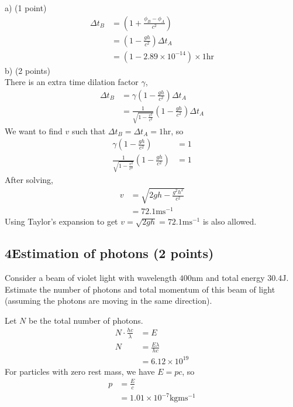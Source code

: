 \documentclass[12pt]{book} %
\numberwithin{equation}{chapter}
\def\c{\gamma}
\def\D{\Delta}
\def\l{\lambda}
\def\lq{\hspace{2.5ex}}
\begin{document}
\begin{solbox}
a) (1 point)
\begin{align*}
\D t_{B}&=\left(1+\frac{\phi_{B}-\phi_{A}}{c^{2}}\right)\\
&=\left(1-\frac{gh}{c^{2}}\right)\D t_{A}\\
&=\left(1-2.89\times10^{-14}\right)\times 1\text{hr}
\end{align*}
b) (2 points)\\
There is an extra time dilation factor $\c$,
\begin{align*}
\D t_{B}&=\c\left(1-\frac{gh}{c^{2}}\right)\D t_{A}\\
&=\frac{1}{\sqrt{1-\frac{v^{2}}{c^{2}}}}\left(1-\frac{gh}{c^{2}}\right)\D t_{A}
\end{align*}
We want to find $v$ such that $\D t_{B}=\D t_{A}=1\text{hr}$, so
\begin{align*}
\c\left(1-\frac{gh}{c^{2}}\right)&=1\\
\frac{1}{\sqrt{1-\frac{v^{2}}{c^{2}}}}\left(1-\frac{gh}{c^{2}}\right)&=1
\end{align*}
After solving,
\begin{align*}
v&=\sqrt{2gh-\frac{g^{2}h^{2}}{c^{2}}}\\
&=72.1\text{m}\text{s}^{-1}
\end{align*}
Using Taylor's expansion to get $v=\sqrt{2gh}=72.1\text{m}\text{s}^{-1}$ is also allowed.
\end{solbox}

\subsection*{4\lq Estimation of photons (2 points)}
Consider a beam of violet light with wavelength $400\text{nm}$ and total energy $30.4\text{J}$. Estimate the number of photons and total momentum of this beam of light (assuming the photons are moving in the same direction).

\begin{solbox}
Let $N$ be the total number of photons.
\begin{align*}
N\cdot\frac{hc}{\l}&=E\\
N&=\frac{E\l}{hc}\\
&=6.12\times10^{19}
\end{align*}
For particles with zero rest mass, we have $E=pc$, so
\begin{align*}
p&=\frac{E}{c}\\
&=1.01\times10^{-7}\text{kg}\text{m}\text{s}^{-1}
\end{align*}
\end{solbox}
\end{document}
